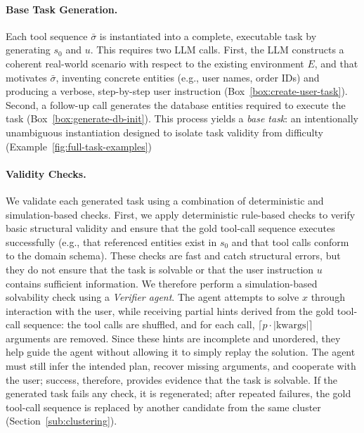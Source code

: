 \paragraph{Base Task Generation.} 
Each tool sequence $\bar\sigma$ is instantiated into a complete, executable task by generating $s_0$ and $u$. This requires two LLM calls. First, the LLM constructs a coherent real-world scenario with respect to the existing environment $E$, and that motivates $\bar\sigma$, inventing concrete entities (e.g., user names, order IDs) and producing a verbose, step-by-step user instruction (Box~\ref{box:create-user-task}). Second, a follow-up call generates the database entities required to execute the task (Box~\ref{box:generate-db-init}). This process yields a \emph{base task}: an intentionally unambiguous instantiation designed to isolate task validity from difficulty (Example~\ref{fig:full-task-examples})

\paragraph{Validity Checks.}
We validate each generated task using a combination of deterministic and simulation-based checks. First, we apply deterministic rule-based checks to verify basic structural validity and ensure that the gold tool-call sequence executes successfully (e.g., that referenced entities exist in $s_0$ and that tool calls conform to the domain schema). These checks are fast and catch structural errors, but they do not ensure that the task is solvable or that the user instruction $u$ contains sufficient information. We therefore perform a simulation-based solvability check using a \emph{Verifier agent}. The agent attempts to solve $x$ through interaction with the user, while receiving partial hints derived from the gold tool-call sequence: the tool calls are shuffled, and for each call, $\lceil p \cdot |\text{kwargs}| \rceil$ arguments are removed. Since these hints are incomplete and unordered, they help guide the agent without allowing it to simply replay the solution. The agent must still infer the intended plan, recover missing arguments, and cooperate with the user; success, therefore, provides evidence that the task is solvable. If the generated task fails any check, it is regenerated; after repeated failures, the gold tool-call sequence is replaced by another candidate from the same cluster (Section~\ref{sub:clustering}). 

